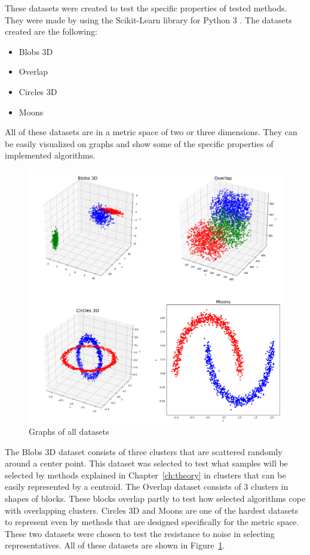 \documentclass[thesis=B,english]{FITthesis}[2012/10/20]
\begin{document}
These datasets were created to test the specific properties of tested methods.
They were made by using the Scikit-Learn library for Python 3 \cite{scikit-learn}.
The datasets created are the following:
\begin{itemize}
    \item Blobs 3D
    \item Overlap
    \item Circles 3D
    \item Moons
\end{itemize}
All of these datasets are in a metric space of two or three dimensions.
They can be easily visualized on graphs and show some of the specific properties of implemented algorithms.
\begin{figure}
  \includegraphics[width=\linewidth]{img/datasets.png}
  \caption{Graphs of all datasets}
  \label{img:datasets}
\end{figure}

The Blobs 3D dataset consists of three clusters that are scattered randomly around a center point.
This dataset was selected to test what samples will be selected by methods explained in Chapter~\ref{ch:theory} in clusters that can be easily represented by a centroid.
The Overlap dataset consists of 3 clusters in shapes of blocks.
These blocks overlap partly to test how selected algorithms cope with overlapping clusters.
Circles 3D and Moons are one of the hardest datasets to represent even by methods that are designed specifically for the metric space.
These two datasets were chosen to test the resistance to noise in selecting representatives.
All of these datasets are shown in Figure~\ref{img:datasets}.
\end{document}
